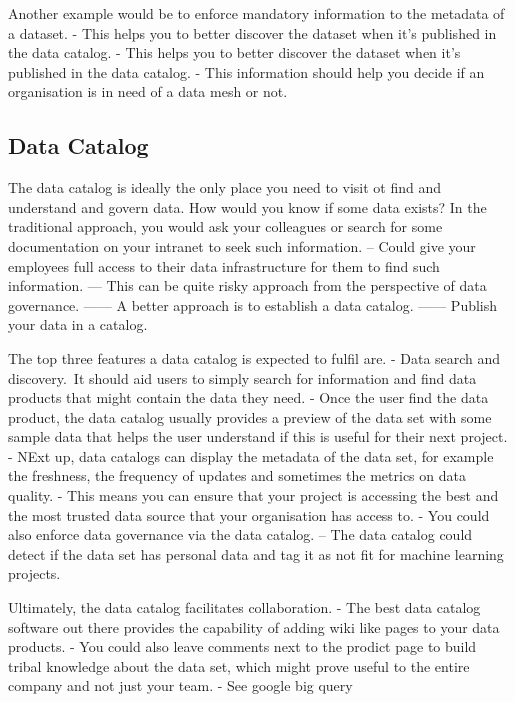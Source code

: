 \documentclass[a4paper, 11pt]{article}
\begin{document}
    Another example would be to enforce mandatory information to the metadata of a dataset.
    - This helps you to better discover the dataset when it's published in the data catalog.
    - This helps you to better discover the dataset when it's published in the data catalog.
    - This information should help you decide if an organisation is in need of a data mesh or not.

    \subsection{Data Catalog}
    The data catalog is ideally the only place you need to visit ot find and understand and govern data.
    How would you know if some data exists?
    In the traditional approach, you would ask your colleagues or search for some documentation on your intranet to seek such information.
    -- Could give your employees full access to their data infrastructure for them to find such information.
    --- This can be quite risky approach from the perspective of data governance.
    ------ A better approach is to establish a data catalog.
    ------ Publish your data in a catalog.

    The top three features a data catalog is expected to fulfil are.
    - Data search and discovery.\ It should aid users to simply search for information and find data products that might contain the data they need.
    - Once the user find the data product, the data catalog usually provides a preview of the data set with some sample data that helps the user understand if this is useful for their next project.
    - NExt up, data catalogs can display the metadata of the data set, for example the freshness, the frequency of updates and sometimes the metrics on data quality.
    - This means you can ensure that your project is accessing the best and the most trusted data source that your organisation has access to.
    - You could also enforce data governance via the data catalog.
    -- The data catalog could detect if the data set has personal data and tag it as not fit for machine learning projects.

    Ultimately, the data catalog facilitates collaboration.
    - The best data catalog software out there provides the capability of adding wiki like pages to your data products.
    - You could also leave comments next to the prodict page to build tribal knowledge about the data set, which might prove useful to the entire company and not just your team.
    - See google big query
\end{document}
